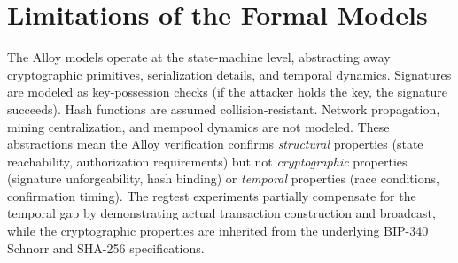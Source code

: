 \section{Limitations of the Formal Models}

The Alloy models operate at the state-machine level, abstracting away cryptographic
primitives, serialization details, and temporal dynamics. Signatures are modeled as
key-possession checks (if the attacker holds the key, the signature succeeds). Hash
functions are assumed collision-resistant. Network propagation, mining centralization,
and mempool dynamics are not modeled. These abstractions mean the Alloy verification
confirms \emph{structural} properties (state reachability, authorization requirements)
but not \emph{cryptographic} properties (signature unforgeability, hash binding) or
\emph{temporal} properties (race conditions, confirmation timing). The regtest
experiments partially compensate for the temporal gap by demonstrating actual
transaction construction and broadcast, while the cryptographic properties are
inherited from the underlying BIP-340 Schnorr and SHA-256 specifications.
